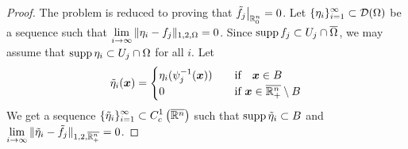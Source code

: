 \begin{proof}
The problem is reduced to proving that
$\displaystyle \tilde{f}_j \big|_{\mathbb{R}^n_0} = 0$.
Let $\displaystyle \{ \eta_i \}_{i=1}^\infty \subset \mathcal{D}(\Omega)$
be a sequence such that
$\displaystyle \lim_{i\rightarrow \infty} \|\eta_i -f_j \|_{1,2,\Omega} = 0$.
Since $\displaystyle \operatorname{supp} f_j \subset U_j \cap \overline{\Omega}$, we
may assume that $\operatorname{supp} \eta_i \subset U_j \cap \Omega$ for all $i$.
Let
\[
\tilde{\eta}_i({\bm{x}}) =
\begin{cases}
\eta_i(\psi_j^{-1}({\bm{x}})) & \quad \text{if} \quad {\bm{x}} \in B \\
0 & \quad \text{if} \ {\bm{x}} \in \overline{\mathbb{R}^n_+} \setminus B
\end{cases}
\]
We get a sequence
$\displaystyle \{ \tilde{\eta}_i \}_{i=1}^\infty \subset
C^1_c\left(\overline{\mathbb{R}^n}\right)$
such that $\operatorname{supp} \tilde{\eta}_i \subset B$ and
$\displaystyle \lim_{i\rightarrow \infty}
\|\tilde{\eta}_i -\tilde{f}_j \|_{1,2,\overline{\mathbb{R}^n_+}} = 0$.


\end{proof}
